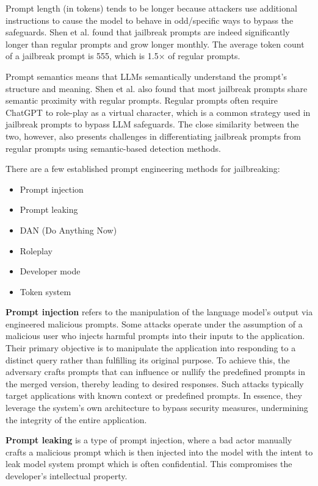 Prompt length (in tokens) tends to be longer because attackers use additional instructions to cause the model to behave in odd/specific ways to bypass the safeguards.
Shen et al.\cite{shen2024donowcharacterizingevaluating} found that jailbreak prompts are indeed significantly longer than regular prompts and grow longer monthly. The average token count of a jailbreak prompt is 555, which is 1.5× of regular prompts.

Prompt semantics means that LLMs semantically understand the prompt's structure and meaning. Shen et al.\cite{shen2024donowcharacterizingevaluating} also found that most jailbreak prompts share semantic proximity with regular prompts. Regular prompts often require ChatGPT to role-play as a virtual character, which is a common strategy used in jailbreak prompts to bypass LLM safeguards. The close similarity between the two, however, also presents challenges in differentiating jailbreak prompts from regular prompts using semantic-based detection methods.



There are a few established prompt engineering methods for jailbreaking:
\begin{itemize}
    \item Prompt injection
    \item Prompt leaking
    \item DAN (Do Anything Now)
    \item Roleplay
    \item Developer mode
    \item Token system
\end{itemize}

\textbf{Prompt injection} refers to the manipulation of the language model's output via engineered malicious prompts. Some attacks operate under the assumption of a malicious user who injects harmful prompts into their inputs to the application. Their primary objective is to manipulate the application into responding to a distinct query rather than fulfilling its original purpose. To achieve this, the adversary crafts prompts that can influence or nullify the predefined prompts in the merged version, thereby leading to desired responses. Such attacks typically target applications with known context or predefined prompts. In essence, they leverage the system's own architecture to bypass security measures, undermining the integrity of the entire application\cite{liu2024promptinjectionattackllmintegrated}.

\textbf{Prompt leaking} is a type of prompt injection, where a bad actor manually crafts a malicious prompt which is then injected into the model with the intent to leak model system prompt which is often confidential. This compromises the developer’s intellectual property.

